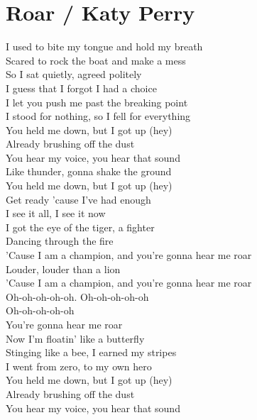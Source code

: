 \section{Roar / Katy Perry}\label{sec:roar}

\Cmajor
\Aminor

I used to bite my tongue and hold my breath\\
Scared to rock the boat and make a mess\\
So I sat quietly, agreed politely\\
I guess that I forgot I had a choice\\
I let you push me past the breaking point\\
I stood for nothing, so I fell for everything\\
You held me down, but I got up (hey)\\
Already brushing off the dust\\
You hear my voice, you hear that sound\\
Like thunder, gonna shake the ground\\
You held me down, but I got up (hey)\\
Get ready 'cause I've had enough\\
I see it all, I see it now\\
I got the eye of the tiger, a fighter\\
Dancing through the fire\\
'Cause I am a champion, and  you're gonna hear me roar\\
Louder, louder than a lion\\
'Cause I am a champion, and you're gonna hear me roar\\
Oh-oh-oh-oh-oh. Oh-oh-oh-oh-oh\\
Oh-oh-oh-oh-oh\\
You're gonna hear me roar\\
Now I'm floatin' like a butterfly\\
Stinging like a bee, I earned my stripes\\
I went from zero, to my own hero\\
You held me down, but I got up (hey)\\
Already brushing off the dust\\
You hear my voice, you hear that sound\\
